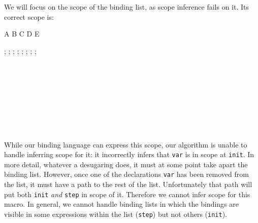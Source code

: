 We will focus on the scope of the binding list, as scope inference
fails on it. Its correct scope is:\\%
\begin{scopeDescription}
\begin{center}
\begin{tikzScopeDiagram}
  \tikzRoot
    {A}{
      {B}{}
      {C}{}
      {D}{}
      {E}{}}

  \begin{tikzEdges}
    ;
    ;
    ;
    ;
    ;
    ;
    ;
    ;
  \end{tikzEdges}
\end{tikzScopeDiagram}
\end{center}
\hspace{3.7em}%
\begin{ScopeRules}
   \\
   \\
   \\
   \\
   \\
   \\
   \\
\end{ScopeRules}
\end{scopeDescription}

While our binding language can express this scope, our algorithm is
unable to handle inferring scope for it: it incorrectly infers that
\texttt{var} is in scope at \texttt{init}. In more detail, whatever a
desugaring does, it must at some point take apart the binding
list. However, once one of the declarations \texttt{var} has been
removed from the list, it must have a path to the rest of the
list. Unfortunately that path will put both \texttt{init} \emph{and}
\texttt{step} in scope of it. Therefore we cannot infer scope for this
macro. In general, we cannot handle binding lists in which the
bindings are visible in some expressions within the list
(\texttt{step}) but not others (\texttt{init}).

